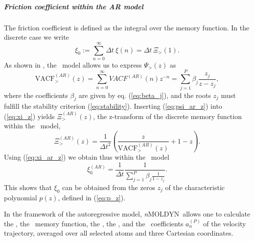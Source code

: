 \documentclass[a4paper,11pt]{report}
\newcommand{\NMOLDYN}{\textit{n}MOLDYN}
\begin{document}
\subparagraph{Friction coefficient within the AR model} The friction coefficient is defined as the integral over 
the memory function. In the discrete case we write
\begin{equation}
\label{eq:xi_0}
\xi_0 := \sum_{n=0}^{\infty}\Delta t\:\xi(n) = 
\Delta t\,\Xi_{>}(1).
\end{equation}
As shown in \cite{Hinsen:2001}, the \AR\ model allows us to express ${\Psi_{>}(z)}$ as
\begin{equation}
\label{eq:psi_ar_z}
\mathrm{VACF}^{(AR)}_{>}(z)=\sum_{n=0}^{\infty}VACF^{(AR)}(n) z^{-n} = \sum_{j=1}^{P}\beta_j \frac{z_j}{z-z_j},
\end{equation} 
where the coefficients $\beta_j$ are given by eq. (\ref{eq:beta_j}), and the roots $z_j$ must fulfill the stability 
criterion (\ref{eq:stability}).
Inserting (\ref{eq:psi_ar_z}) into (\ref{eq:xi_z}) yields $\Xi^{(AR)}_{>}(z)$, the z-transform of the discrete memory 
function within the \AR\ model,
\begin{equation}
\label{eq:xi_ar_z}
\Xi^{(AR)}_{>}(z) = \frac{1}{\Delta t^2}
\left(\frac{z}{\mathrm{VACF}^{(AR)}_{>}(z)} + 1 - z\right).
\end{equation}
Using (\ref{eq:xi_ar_z}) we obtain thus within the \AR\ model
\begin{equation}
\label{eq:xi_0_2}
\xi^{(AR)}_0 = \frac{1}{\Delta t}
\frac{1}{\sum_{j=1}^{P}\beta_j\frac{1}{1-z_j}}.
\end{equation}
This shows that $\xi_0$ can be obtained from the zeros $z_j$ of the characteristic polynomial $p(z)$, defined in (\ref{eq:p_z}).

In the framework of the autoregressive model, \NMOLDYN\ allows one to calculate the \VACF, the \VACF\ memory function, the 
\DOS , the \MSD , and the \AR\ coefficients $a_n^{(P)}$ of the velocity trajectory, averaged over all selected atoms 
and three Cartesian coordinates. 
\end{document}
